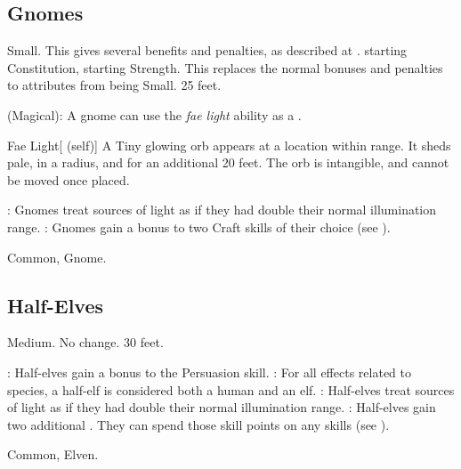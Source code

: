 \subsection{Gnomes}
 Small. This gives several benefits and penalties, as described at .
  starting Constitution,  starting Strength. This replaces the normal bonuses and penalties to attributes from being Small.
 25 feet.
\begin{itemize}
     (Magical): A gnome can use the \textit{fae light} ability as a .
        \begin{attuneability}{Fae Light}[ (self)]
            A Tiny glowing orb appears at a location within \rngmed range.
            It sheds pale,  in a \areamed radius, and  for an additional 20 feet.
            The orb is intangible, and cannot be moved once placed.
        \end{attuneability}
    : Gnomes treat sources of light as if they had double their normal illumination range.
    : Gnomes gain a  bonus to two Craft skills of their choice (see ).
\end{itemize}
 Common, Gnome.

\subsection{Half-Elves}\label{Half-Elves}
 Medium.
 No change.
 30 feet.
\begin{itemize}
    : Half-elves gain a  bonus to the Persuasion skill.
    : For all effects related to species, a half-elf is considered both a human and an elf.
    : Half-elves treat sources of light as if they had double their normal illumination range.
    : Half-elves gain two additional . They can spend those skill points on any skills (see ).
\end{itemize}
 Common, Elven.

